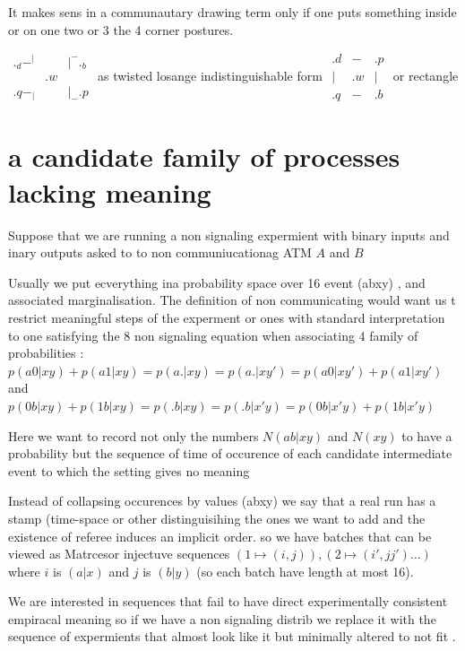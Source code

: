 \documentclass{article}
\begin{document}
It makes sens in a communautary drawing term only if one puts something inside  or on one two or 3 the 4  corner postures.

 $\begin{matrix} ._d-^|&&|^-._b \\
 				 &.w& \\
				 .q-_|&&|_-.p
				 \end{matrix}$  as twisted losange indistinguishable  form 
 $\begin{matrix} .d&-&.p\\
                          |&.w&|\\
                          .q&-&.b
       \end{matrix}$ or rectangle


\section{ a candidate family of processes lacking meaning}
Suppose that we are running a non signaling expermient with binary inputs and inary outputs asked to to non communiucationag ATM $A$ and $B$

Usually we put ecverything ina probability space over 16 event (abxy) , and associated marginalisation.
 The definition of non communicating would want us t restrict meaningful steps of the experment or ones with standard interpretation to one satisfying 
the 8 non signaling equation when associating 4 family of probabilities : 
$p(a0|xy)+p(a1|xy)=p(a.|xy)=p(a.|xy')= p(a0|xy')+p(a1|xy')$ 
and $p(0b|xy)+p(1b|xy)=p(.b|xy)=p(.b|x'y)=p(0b|x'y)+p(1b|x'y)$ 
    
 Here we want to record not only the numbers  $ N(ab|xy)$  and $N(xy)$ to have a probability but the sequence of time of occurence of each candidate intermediate event to which the setting gives no meaning
 
 Instead of collapsing occurences by values (abxy) we say that a real run has a stamp (time-space or other distinguisihing the ones we want to add and the existence of referee induces an implicit order. so we have batches that can be viewed as Matrcesor injectuve  sequences $(1\mapsto (i,j)),(2\mapsto (i',jj')\ldots )$ where $i$ is $(a|x)$ and $j$ is $(b|y)$  (so each batch have length at most 16).
 
 We are interested in sequences that fail to have direct experimentally consistent empiracal meaning so if we have a non signaling distrib we replace it with the sequence of expermients that almost look like it but minimally altered to not fit .
 
\end{document}
